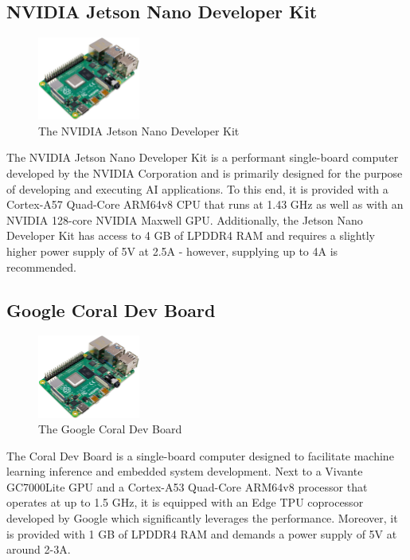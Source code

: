 \subsection{NVIDIA Jetson Nano Developer Kit}

\begin{figure}[h]
    \centering
    \includegraphics[width=0.30\textwidth]{./figures/mesh}
    \caption{The NVIDIA Jetson Nano Developer Kit}
    \label{fig:jetson-nano}
\end{figure}

The NVIDIA Jetson Nano Developer Kit is a performant single-board computer developed by the NVIDIA Corporation and is primarily designed for the purpose of developing and executing AI applications. To this end, it is provided with a Cortex-A57 Quad-Core ARM64v8 CPU that runs at 1.43 GHz as well as with an NVIDIA 128-core NVIDIA Maxwell GPU. Additionally, the Jetson Nano Developer Kit has access to 4 GB of LPDDR4 RAM and requires a slightly higher power supply of 5V at 2.5A - however, supplying up to 4A is recommended.~\parencite{jetson-nano-devkit-manual}

\subsection{Google Coral Dev Board}

\begin{figure}[h]
    \centering
    \includegraphics[width=0.30\textwidth]{./figures/mesh}
    \caption{The Google Coral Dev Board}
    \label{fig:coral-dev-board}
\end{figure}

The Coral Dev Board is a single-board computer designed to facilitate machine learning inference and embedded system development. Next to a Vivante GC7000Lite GPU and a Cortex-A53 Quad-Core ARM64v8 processor that operates at up to 1.5 GHz, it is equipped with an Edge TPU coprocessor developed by Google which significantly leverages the performance. Moreover, it is provided with 1 GB of LPDDR4 RAM and demands a power supply of 5V at around 2-3A.~\parencite{coral-dev-board-manual}

